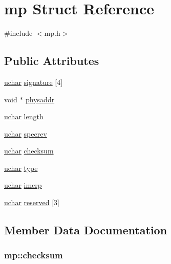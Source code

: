 \hypertarget{structmp}{}\section{mp Struct Reference}
\label{structmp}


{\ttfamily \#include $<$mp.\+h$>$}

\subsection*{Public Attributes}
\begin{DoxyCompactItemize}
\item 
\hyperlink{custom__types_8h_a65f85814a8290f9797005d3b28e7e5fc}{uchar} \hyperlink{structmp_af2bfc400b8e6edae4c0e6ff437a2a1f4}{signature} \mbox{[}4\mbox{]}
\item 
void $\ast$ \hyperlink{structmp_a3333bff25a42470efb69b3b01f08d6ce}{physaddr}
\item 
\hyperlink{custom__types_8h_a65f85814a8290f9797005d3b28e7e5fc}{uchar} \hyperlink{structmp_a46a03e7ef27f7290a5fb49bcb4c3c507}{length}
\item 
\hyperlink{custom__types_8h_a65f85814a8290f9797005d3b28e7e5fc}{uchar} \hyperlink{structmp_a0be99b736e3c6fb1f405944868674063}{specrev}
\item 
\hyperlink{custom__types_8h_a65f85814a8290f9797005d3b28e7e5fc}{uchar} \hyperlink{structmp_a0d403ddb2898b8cadf31f9f75d31163a}{checksum}
\item 
\hyperlink{custom__types_8h_a65f85814a8290f9797005d3b28e7e5fc}{uchar} \hyperlink{structmp_a08cf79f94b4dcfce588ccb41f90cbe0e}{type}
\item 
\hyperlink{custom__types_8h_a65f85814a8290f9797005d3b28e7e5fc}{uchar} \hyperlink{structmp_ae2157bc407a7423c57bdb078b70cd6e5}{imcrp}
\item 
\hyperlink{custom__types_8h_a65f85814a8290f9797005d3b28e7e5fc}{uchar} \hyperlink{structmp_a7a87ebdff0db6123f294d93ee98c42ab}{reserved} \mbox{[}3\mbox{]}
\end{DoxyCompactItemize}


\subsection{Member Data Documentation}
\subsubsection[{\texorpdfstring{checksum}{checksum}}]{ mp\+::checksum}\hypertarget{structmp_a0d403ddb2898b8cadf31f9f75d31163a}{}\label{structmp_a0d403ddb2898b8cadf31f9f75d31163a}
